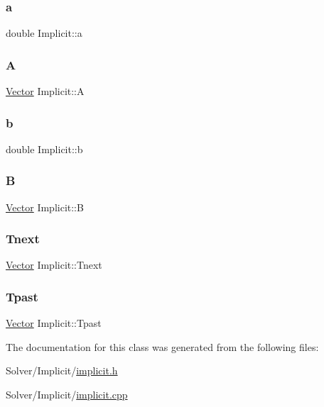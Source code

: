 \subsubsection{\texorpdfstring{a}{a}}
{\footnotesize\ttfamily double Implicit\+::a}

\mbox{\label{class_implicit_a5bdc685b164fc363d26ed1461c0d49b2}} 
\subsubsection{\texorpdfstring{A}{A}}
{\footnotesize\ttfamily \hyperlink{class_vector}{Vector} Implicit\+::A}

\mbox{\label{class_implicit_a270615b52e1106f89b4e6ef928cc12de}} 
\subsubsection{\texorpdfstring{b}{b}}
{\footnotesize\ttfamily double Implicit\+::b}

\mbox{\label{class_implicit_a3f9c9eda634c19c2301698fd81ec5a6b}} 
\subsubsection{\texorpdfstring{B}{B}}
{\footnotesize\ttfamily \hyperlink{class_vector}{Vector} Implicit\+::B}

\mbox{\label{class_implicit_a854215cf2128a1dc1f532bb6664b472c}} 
\subsubsection{\texorpdfstring{Tnext}{Tnext}}
{\footnotesize\ttfamily \hyperlink{class_vector}{Vector} Implicit\+::\+Tnext}

\mbox{\label{class_implicit_a6cd9e0093600402e8bc3b22995aa96b1}} 
\subsubsection{\texorpdfstring{Tpast}{Tpast}}
{\footnotesize\ttfamily \hyperlink{class_vector}{Vector} Implicit\+::\+Tpast}



The documentation for this class was generated from the following files\+:\begin{DoxyCompactItemize}
\item 
Solver/\+Implicit/\hyperlink{implicit_8h}{implicit.\+h}\item 
Solver/\+Implicit/\hyperlink{implicit_8cpp}{implicit.\+cpp}\end{DoxyCompactItemize}
